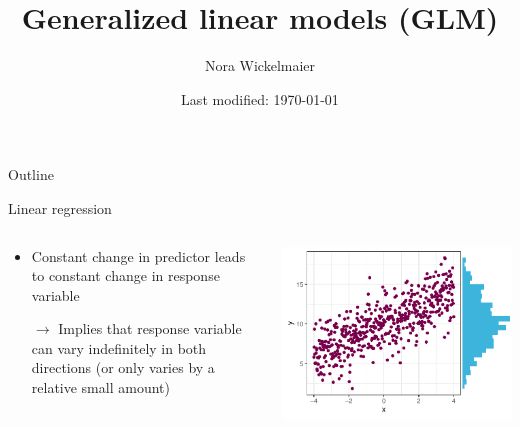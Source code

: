 \documentclass[aspectratio=169]{beamer}
\title{Generalized linear models (GLM)}
\author{Nora Wickelmaier}
\date{Last modified: \today}
\begin{document}
\begin{frame}{}
\thispagestyle{empty}
\titlepage
\end{frame}

\begin{frame}{Outline}
\tableofcontents
\end{frame}

\begin{frame}{Linear regression}
  \begin{columns}
    \begin{column}{.5\textwidth}
      \begin{itemize}
        \item Constant change in predictor leads to constant change in response
          variable\\[2ex]
        \item[$\to$] Implies that response variable can vary indefinitely in both
              directions (or only varies by a relative small amount)
      \end{itemize}
    \end{column}
    \begin{column}{.6\textwidth}
        \includegraphics[scale=.7]{../figures/glm_lin}
    \end{column}
  \end{columns}
\end{frame}
\end{document}
